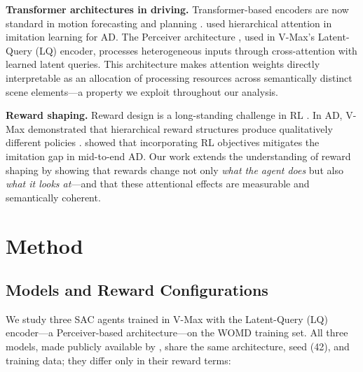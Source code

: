 \documentclass[10pt]{article} %
\begin{document}
\textbf{Transformer architectures in driving.}
Transformer-based encoders are now standard in motion forecasting and planning \citep{vaswani2017attention, nayakanti2023wayformer, shi2024mtr}. \citet{bronstein2022hierarchical} used hierarchical attention in imitation learning for AD. The Perceiver architecture \citep{jaegle2021perceiver}, used in V-Max's Latent-Query (LQ) encoder, processes heterogeneous inputs through cross-attention with learned latent queries. This architecture makes attention weights directly interpretable as an allocation of processing resources across semantically distinct scene elements---a property we exploit throughout our analysis.

\textbf{Reward shaping.}
Reward design is a long-standing challenge in RL \citep{sutton2018reinforcement}. In AD, V-Max demonstrated that hierarchical reward structures produce qualitatively different policies \citep{charraut2025vmax}. \citet{grislain2024igdrivsim} showed that incorporating RL objectives mitigates the imitation gap in mid-to-end AD. Our work extends the understanding of reward shaping by showing that rewards change not only \textit{what the agent does} but also \textit{what it looks at}---and that these attentional effects are measurable and semantically coherent.


\section{Method}
\label{sec:method}

\subsection{Models and Reward Configurations}
\label{sec:models}

We study three SAC agents trained in V-Max with the Latent-Query (LQ) encoder---a Perceiver-based architecture---on the WOMD training set. All three models, made publicly available by \citet{charraut2025vmax}, share the same architecture, seed (42), and training data; they differ only in their reward terms:
\end{document}

